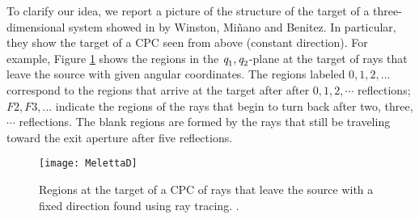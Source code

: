 To clarify our idea, we report a picture of the structure of the target of a three-dimensional system showed in \cite{winston2005nonimaging} by Winston, Mi\~nano and Benitez.
In particular, they show the target of a CPC seen from above (constant direction). For example, Figure \ref{fig:melettaC} shows the regions in the $\textit{q}_1, \textit{q}_2$-plane at the target of rays that leave the source with given angular coordinates. The regions labeled $0, 1, 2,$... correspond to the regions that arrive at the target after after $0, 1, 2, \cdots$ reflections; $F2, F3,$... indicate the regions of the rays that begin to turn back after two, three, $\cdots$ reflections. The blank regions are formed by the rays that
still be traveling toward the exit aperture after five reflections. 
\begin{figure}[h]
\centering
    \texttt{[image: MelettaD]}
    \caption{Regions at the target of a CPC of rays that leave the source with a fixed direction found using ray tracing. \cite{winston2005nonimaging}.}
\label{fig:melettaC}
\end{figure}

